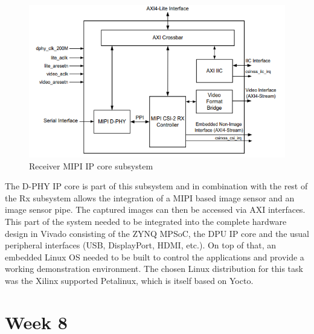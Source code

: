 \begin{figure}[!htb]
	\centering
		\includegraphics[width=\textwidth]{bilder/MIPI_rx.png}
		\caption{Receiver \acs{MIPI} \acs{IP} core subsystem~\cite{mipi-rx}}
		\label{fig:mipi_dphy}
\end{figure}
The D-PHY \ac{IP} core is part of this subsystem and in combination with the rest of the Rx subsystem allows the integration of a \ac{MIPI} based image sensor and an image sensor pipe. The captured images can then be accessed via \ac{AXI} interfaces. This part of the system needed to be integrated into the complete hardware design in Vivado consisting of the ZYNQ \ac{MPSoC}, the \ac{DPU} \ac{IP} core and the usual peripheral interfaces (\ac{USB}, DisplayPort, HDMI, etc.). On top of that, an embedded Linux \ac{OS} needed to be built to control the applications and provide a working demonstration environment. The chosen Linux distribution for this task was the Xilinx supported Petalinux, which is itself based on Yocto.

\section{Week 8}
